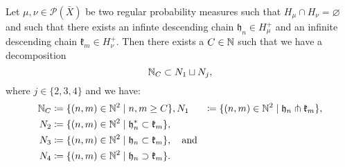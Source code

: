 \begin{lemma}
  \label{lem:sep-n}
  Let \(\mu, \nu \in \mathcal{P}(\bar X)\) be two regular probability measures such that \(H_\mu \cap H_\nu = \varnothing\) and such that there exists an infinte descending chain \(\mathfrak{h}_n\in H_\mu^+\) and an infinite descending chain \(\mathfrak{k}_m \in H_\nu^+\). Then there exists a \(C \in \mathbb{N}\) such that we have a decomposition
  \[
    \mathbb{N}_C \subset N_1 \sqcup N_j,
  \]
  where \(j \in \{2,3,4\}\) and  we have:
  \begin{align*}
    \mathbb{N}_C & \coloneqq \{(n,m) \in \mathbb{N}^2 \mid n,m \geq C\},
    N_1 & \coloneqq \{(n,m) \in \mathbb{N}^2 \mid \mathfrak{h}_n \pitchfork \mathfrak{k}_m\},\\
    N_2 & \coloneqq \{(n,m) \in \mathbb{N}^2 \mid \mathfrak{h}_n^\ast \subset \mathfrak{k}_m\},\\
    N_3 & \coloneqq \{(n,m) \in \mathbb{N}^2 \mid \mathfrak{h}_n \subset \mathfrak{k}_m\},\quad \text{and}\\
    N_4 & \coloneqq \{(n,m) \in \mathbb{N}^2 \mid \mathfrak{h}_n \supset \mathfrak{k}_m\}.
  \end{align*}
\end{lemma}

